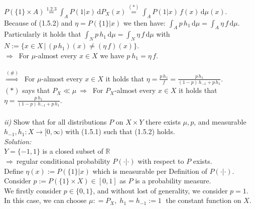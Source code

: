 \documentclass{article}
\begin{document}
\vspace*{-1em} \\
\indent $P(\{ 1\} \times A) \overset{1.2.3}{=} \displaystyle{ \int_{A} P({1}| x)\, \text{d}P_X(x) \overset{(*)}{=} \int_{A} P({1}| x)\, f(x)\, \text{d}\mu(x)  }  $.\vspace*{0.3em}\\
Because of (1.5.2) and $\eta=P(\{ 1\}|x)$ we then have: $\displaystyle{ \int_{A} p\,h_1\, \text{d}\mu =\int_A \eta \, f \, \text{d}\mu  }$.\vspace*{0.1em}\\
Particularly it holds that $\displaystyle{ \int_{N} p\,h_1\, \text{d}\mu =\int_N \eta \, f \, \text{d}\mu  }$ with $N:=\{ x\in X\, | \, (p\,h_1)(x) \neq (\eta \, f)(x)    \}$.\vspace*{0.7em}\\
$\Rightarrow \ $ For $\mu$-almost every $x\in X$ we have $\displaystyle{ p\ h_1 = \eta \, f } $. \\
\vspace*{-1em} \\
$\overset{(\#)}{\Rightarrow} \ $ For $\mu$-almost every $x\in X$ it holds that $\displaystyle{ \eta = \frac{p\, h_{1}}{f} = \frac{p \, h_1}{(1-p)\,h_{-1} + p\, h_1} }$.\\
$(*)$ says that $P_X \ll \mu \ \Rightarrow \ $ For $P_X$-almost every $x\in X$ it holds that $\displaystyle{ \eta = \frac{p \, h_1}{(1-p)\,h_{-1} + p\, h_1} }$.\\
\\
\textsl{ii)} Show that for all distributions $P$ on $X\times Y$ there exists $\mu, p$, and measurable $h_{-1}, h_1: X \rightarrow [0,\infty)$ with (1.5.1) such that (1.5.2) holds. \vspace{0.5em}\\
\textsl{Solution:} \\
$Y=\{-1,1\}$ is a closed subset of $\mathbb{R} \ $\\
$\Rightarrow \ $regular conditional probability $P(\cdot | \cdot )$ with respect to $P$ exists.  \\
Define $\eta(x):=P(\{1\}|x)$ which is measurable per Definition of $P(\cdot | \cdot )$. \\
Consider $p:=P(\{1\} \times X) \in [0,1]$ as $P$ is a probability measure. \\
We firstly consider $p \in \{0,1\}$, and without lost of generality, we consider $p = 1$. \\
In this case, we can choose $\mu: = P_X,\; h_1 = h_{-1} := 1 \;$ the constant function on $X$.\\
\end{document}
